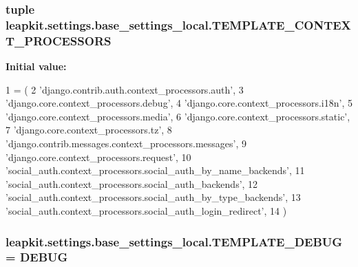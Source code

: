 \hypertarget{namespaceleapkit_1_1settings_1_1base__settings__local_ac5c82a1f7d9b49e7795440b5bdcc4d73}{
\subsubsection[{T\-E\-M\-P\-L\-A\-T\-E\-\_\-\-C\-O\-N\-T\-E\-X\-T\-\_\-\-P\-R\-O\-C\-E\-S\-S\-O\-R\-S}]{\setlength{\rightskip}{0pt plus 5cm}tuple leapkit.\-settings.\-base\-\_\-settings\-\_\-local.\-T\-E\-M\-P\-L\-A\-T\-E\-\_\-\-C\-O\-N\-T\-E\-X\-T\-\_\-\-P\-R\-O\-C\-E\-S\-S\-O\-R\-S}}\label{namespaceleapkit_1_1settings_1_1base__settings__local_ac5c82a1f7d9b49e7795440b5bdcc4d73}
{\bfseries Initial value\-:}
\begin{DoxyCode}
1 = (
2     \textcolor{stringliteral}{'django.contrib.auth.context\_processors.auth'},
3     \textcolor{stringliteral}{'django.core.context\_processors.debug'},
4     \textcolor{stringliteral}{'django.core.context\_processors.i18n'},
5     \textcolor{stringliteral}{'django.core.context\_processors.media'},
6     \textcolor{stringliteral}{'django.core.context\_processors.static'},
7     \textcolor{stringliteral}{'django.core.context\_processors.tz'},
8     \textcolor{stringliteral}{'django.contrib.messages.context\_processors.messages'},
9     \textcolor{stringliteral}{'django.core.context\_processors.request'},
10     \textcolor{stringliteral}{'social\_auth.context\_processors.social\_auth\_by\_name\_backends'},
11     \textcolor{stringliteral}{'social\_auth.context\_processors.social\_auth\_backends'},
12     \textcolor{stringliteral}{'social\_auth.context\_processors.social\_auth\_by\_type\_backends'},
13     \textcolor{stringliteral}{'social\_auth.context\_processors.social\_auth\_login\_redirect'},
14 )
\end{DoxyCode}
\hypertarget{namespaceleapkit_1_1settings_1_1base__settings__local_aa6906a9bb9c301c2a6719df8338d10a4}{
\subsubsection[{T\-E\-M\-P\-L\-A\-T\-E\-\_\-\-D\-E\-B\-U\-G}]{\setlength{\rightskip}{0pt plus 5cm}leapkit.\-settings.\-base\-\_\-settings\-\_\-local.\-T\-E\-M\-P\-L\-A\-T\-E\-\_\-\-D\-E\-B\-U\-G = {\bf D\-E\-B\-U\-G}}}\label{namespaceleapkit_1_1settings_1_1base__settings__local_aa6906a9bb9c301c2a6719df8338d10a4}
